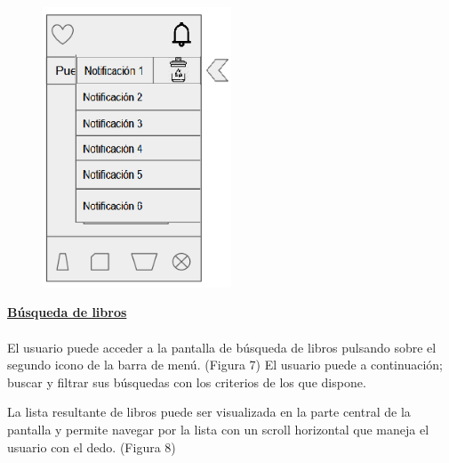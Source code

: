 \documentclass[12pt]{article}
\begin{document}
\begin{figure}[!h]
\centering
{}
	\includegraphics[width=0.5\textwidth]{notificaciones3.png} 
\endminipage
\end{figure}

\newpage
\textbf{\underline{Búsqueda de libros}} \\
\\
El usuario puede acceder a la pantalla de búsqueda de libros pulsando sobre el segundo icono de la barra de menú. (Figura 7) El usuario puede a continuación; buscar y filtrar sus búsquedas con los criterios de los que dispone.

La lista resultante de libros puede ser visualizada en la parte central de la pantalla y permite navegar por la lista con un scroll horizontal que maneja el usuario con el dedo. (Figura 8)\\
\end{document}
